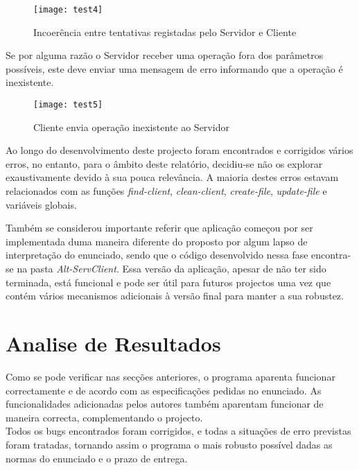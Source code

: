 \begin{figure}[H]
	\centering
	\texttt{[image: test4]}
	\caption{Incoerência entre tentativas registadas pelo Servidor e Cliente\\}
	\label{fig:test4}
\end{figure} 

Se por alguma razão o Servidor receber uma operação fora dos parâmetros possíveis, este deve enviar uma mensagem de erro informando que a operação é inexistente.

\begin{figure}[H]
	\centering
	\texttt{[image: test5]}
	\caption{Cliente envia operação inexistente ao Servidor\\}
	\label{fig:test5}
\end{figure} 

Ao longo do desenvolvimento deste projecto foram encontrados e corrigidos vários erros, no entanto, para o âmbito deste relatório, decidiu-se não os explorar exaustivamente devido à sua pouca relevância. A maioria destes erros estavam relacionados com as funções \textit{find-client}, \textit{clean-client}, \textit{create-file}, \textit{update-file} e variáveis globais.

Também se considerou importante referir que aplicação começou por ser implementada duma maneira diferente do proposto por algum lapso de interpretação do enunciado, sendo que o código desenvolvido nessa fase encontra-se na pasta \textit{Alt-ServClient}. Essa versão da aplicação, apesar de não ter sido terminada, está funcional e pode ser útil para futuros projectos uma vez que contém vários mecanismos adicionais à versão final para manter a sua robustez.


\section{Analise de Resultados}
\label{sec.analise-resultados}
Como se pode verificar nas secções anteriores, o programa aparenta funcionar correctamente e de acordo com as especificações pedidas no enunciado. As funcionalidades adicionadas pelos autores também aparentam funcionar de maneira correcta, complementando o projecto. \\
Todos os bugs encontrados foram corrigidos, e todas a situações de erro previstas foram tratadas, tornando assim o programa o mais robusto possível dadas as normas do enunciado e o prazo de entrega.\\

%
%
